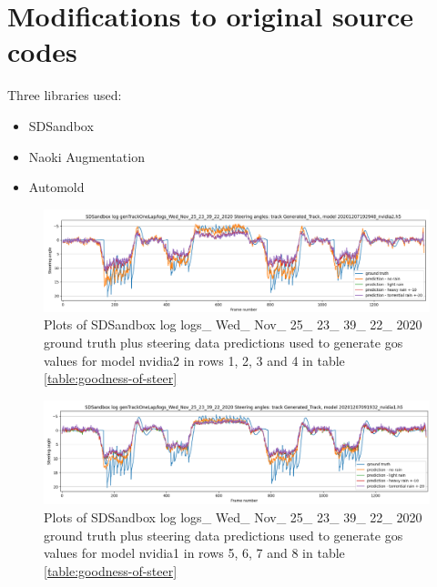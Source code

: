 


\section{Modifications to original source codes}
Three libraries used:
\begin{itemize}
    \item SDSandbox
    \item Naoki Augmentation
    \item Automold
\end{itemize}




\begin{figure}[ht]
 \centering 
 \includegraphics[width=\textwidth]{Figures/sa_Generated_Track_20201207192948_nvidia2.h5.png}
 \caption{Plots of SDSandbox log logs\_ Wed\_ Nov\_ 25\_ 23\_ 39\_ 22\_ 2020 ground truth plus steering data predictions used to generate gos values for model nvidia2 in rows 1, 2, 3 and 4 in table \ref{table:goodness-of-steer}}
 \label{fig:sa_Generated_Track_20201207192948_nvidia2.h5} 
\end{figure}

\begin{figure}[ht]
 \centering 
 \includegraphics[width=\textwidth]{Figures/sa_Generated_Track_20201207091932_nvidia1.h5.png}
 \caption{Plots of SDSandbox log logs\_ Wed\_ Nov\_ 25\_ 23\_ 39\_ 22\_ 2020 ground truth plus steering data predictions used to generate gos values for model nvidia1 in rows 5, 6, 7  and 8 in table \ref{table:goodness-of-steer}}
 \label{fig:sa_Generated_Track_20201207091932_nvidia1.h5} 
\end{figure}


